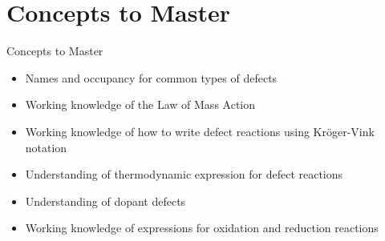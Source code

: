 \documentclass{libs/XJTLU_format}
\begin{document}
\section{Concepts to Master}
\begin{frame}{Concepts to Master}
\begin{itemize}
    \item Names and occupancy for common types of defects \pause
    \item Working knowledge of the Law of Mass Action \pause
    \item Working knowledge of how to write defect reactions using Kröger-Vink notation \pause
    \item Understanding of thermodynamic expression for defect reactions \pause
    \item Understanding of dopant defects \pause
    \item Working knowledge of expressions for oxidation and reduction reactions
\end{itemize}
\end{frame}

    

\end{document}
